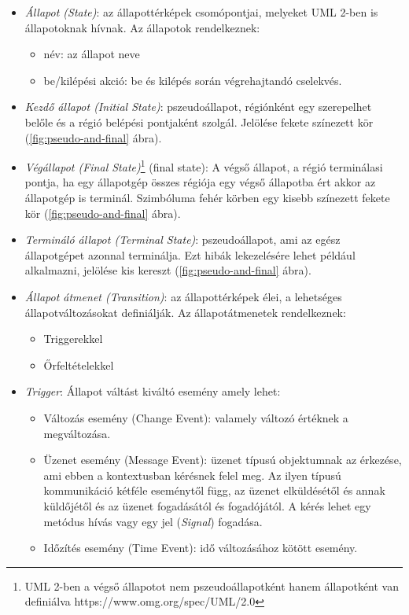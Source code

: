 \begin{itemize}
	\item \emph{Állapot (State)}: az állapottérképek csomópontjai, melyeket UML 2-ben is állapotoknak hívnak. Az állapotok rendelkeznek:
	\begin{itemize}
		\item név: az állapot neve
		\item be/kilépési akció: be és kilépés során végrehajtandó cselekvés.
	\end{itemize}
	
	\item \emph{Kezdő állapot (Initial State)}: pszeudoállapot, régiónként egy szerepelhet belőle és a régió belépési pontjaként szolgál. Jelölése fekete színezett kör (\ref{fig:pseudo-and-final} ábra).
	\item \emph{Végállapot (Final State)}\footnote{UML 2-ben a végső állapotot nem pszeudoállapotként hanem állapotként van definiálva https://www.omg.org/spec/UML/2.0} (final state): A végső állapot, a régió terminálasi pontja, ha egy állapotgép összes régiója egy végső állapotba ért akkor az állapotgép is terminál. Szimbóluma fehér körben egy kisebb színezett fekete kör (\ref{fig:pseudo-and-final} ábra).
	\item \emph{Termináló állapot (Terminal State)}: pszeudoállapot, ami az egész állapotgépet azonnal terminálja. Ezt hibák lekezelésére lehet például alkalmazni, jelölése kis kereszt (\ref{fig:pseudo-and-final} ábra).
	\item \emph{Állapot átmenet (Transition)}: az állapottérképek élei, a lehetséges állapotváltozásokat definiálják. Az állapotátmenetek rendelkeznek:
		\begin{itemize}
			\item Triggerekkel
			\item Őrfeltételekkel
		\end{itemize}
	\item \emph{Trigger}: Állapot váltást kiváltó esemény amely lehet:
	\begin{itemize}
		\item Változás esemény (Change Event): valamely változó értéknek a megváltozása.
		\item Üzenet esemény (Message Event): üzenet típusú objektumnak az érkezése, ami ebben a kontextusban kérésnek felel meg. Az ilyen típusú kommunikáció kétféle eseménytől függ, az üzenet elküldésétől és annak küldőjétől és az üzenet fogadásától és fogadójától. A kérés lehet egy metódus hívás vagy egy jel (\emph{Signal}) fogadása.
		\item Időzítés esemény (Time Event): idő változásához kötött esemény.
	\end{itemize}

\end{itemize}
